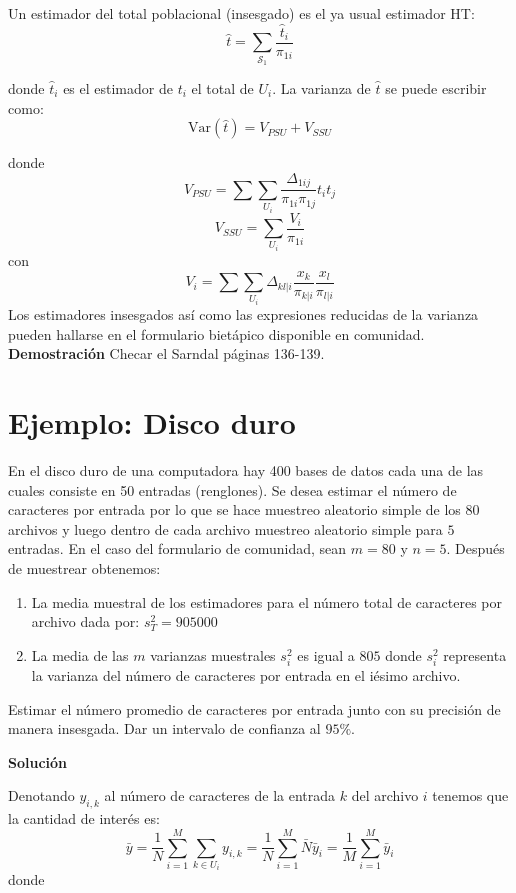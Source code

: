 \documentclass[
]{book}
\providecommand{\tightlist}{%
  \setlength{\itemsep}{0pt}\setlength{\parskip}{0pt}}
\begin{document}
Un estimador del total poblacional (insesgado) es el ya usual estimador HT:
\[
\hat{t} = \sum\limits_{\mathcal{S}_1} \frac{\hat{t}_{i}}{\pi_{1i}}
\]

donde \(\hat{t}_{i}\) es el estimador de \(t_i\) el total de \(U_i\). La varianza de \(\hat{t}\) se puede escribir como:
\[
\textrm{Var}(\hat{t}) = V_{PSU} + V_{SSU}
\]

donde
\[
V_{PSU} = \sum\sum_{U_i} \dfrac{\Delta_{1ij}}{\pi_{1i} \pi_{1j}} t_i t_j
\]
\[
V_{SSU} = \sum_{U_i} \dfrac{V_i}{\pi_{1i}}
\]
con
\[
V_i = \sum\sum_{U_i} \Delta_{kl|i} \dfrac{x_k}{\pi_{k|i}}\dfrac{x_l}{\pi_{l|i}}
\]
Los estimadores insesgados así como las expresiones reducidas de la varianza pueden hallarse en el formulario bietápico disponible en comunidad. \textbf{Demostración} Checar el Sarndal páginas 136-139.

\hypertarget{ejemplo-disco-duro}{%
\section{Ejemplo: Disco duro}\label{ejemplo-disco-duro}}

En el disco duro de una computadora hay 400 bases de datos cada una de las cuales consiste en 50 entradas (renglones). Se desea estimar el número de caracteres por entrada por lo que se hace muestreo aleatorio simple de los 80 archivos y luego dentro de cada archivo muestreo aleatorio simple para \(5\) entradas. En el caso del formulario de comunidad, sean \(m = 80\) y \(n = 5\). Después de muestrear obtenemos:

\begin{enumerate}
\def\labelenumi{\alph{enumi}.}
\tightlist
\item
  La media muestral de los estimadores para el número total de caracteres por archivo dada por: \(s^2_T = 905000\)
\item
  La media de las \(m\) varianzas muestrales \(s^2_i\) es igual a \(805\) donde \(s^2_i\) representa la varianza del número de caracteres por entrada en el iésimo archivo.
\end{enumerate}

Estimar el número promedio de caracteres por entrada junto con su precisión de manera insesgada. Dar un intervalo de confianza al \(95\%\).

\textbf{Solución}

Denotando \(y_{i,k}\) al número de caracteres de la entrada \(k\) del archivo \(i\) tenemos que la cantidad de interés es:
\[
\bar{y} =\frac{1}{N} \sum\limits_{i = 1}^M \sum_{k \in U_i} y_{i,k} = \frac{1}{N} \sum\limits_{i = 1}^M \bar{N}\bar{y}_i = \frac{1}{M}\sum_{i = 1}^M \bar{y}_i
\]
donde
\end{document}

